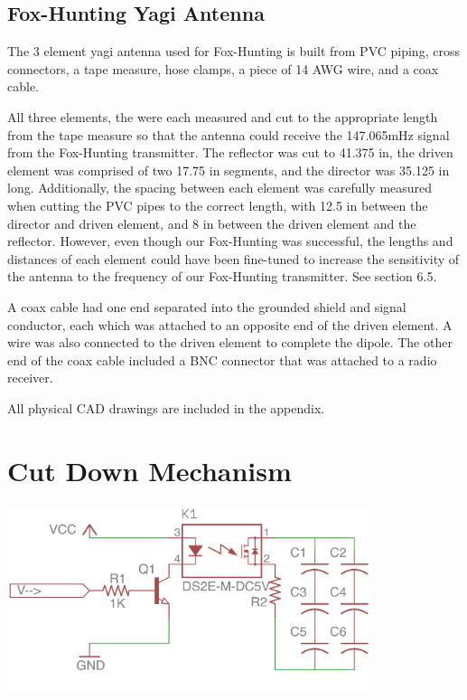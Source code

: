 \documentclass[12pt,]{article}
\begin{document}
\subsection{Fox-Hunting Yagi Antenna}\label{fox-hunting-yagi-antenna}

The 3 element yagi antenna used for Fox-Hunting is built from PVC
piping, cross connectors, a tape measure, hose clamps, a piece of 14 AWG
wire, and a coax cable.

All three elements, the were each measured and cut to the appropriate
length from the tape measure so that the antenna could receive the
147.065mHz signal from the Fox-Hunting transmitter. The reflector was
cut to 41.375 in, the driven element was comprised of two 17.75 in
segments, and the director was 35.125 in long. Additionally, the spacing
between each element was carefully measured when cutting the PVC pipes
to the correct length, with 12.5 in between the director and driven
element, and 8 in between the driven element and the reflector. However,
even though our Fox-Hunting was successful, the lengths and distances of
each element could have been fine-tuned to increase the sensitivity of
the antenna to the frequency of our Fox-Hunting transmitter. See section
6.5.

A coax cable had one end separated into the grounded shield and signal
conductor, each which was attached to an opposite end of the driven
element. A wire was also connected to the driven element to complete the
dipole. The other end of the coax cable included a BNC connector that
was attached to a radio receiver.

All physical CAD drawings are included in the appendix.

\section{Cut Down Mechanism}\label{cut-down-mechanism}

\begin{center}\includegraphics[width=400px]{assets/cutdown} \end{center}
\end{document}
